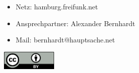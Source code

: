 \documentclass[c]{beamer}
\begin{document}
\begin{frame}{}
	\begin{columns}
		\begin{column}{1\textwidth}
			\begin{itemize}
				\item Netz: hamburg.freifunk.net
				\item Ansprechpartner: Alexander Bernhardt 
				\item Mail: bernhardt@hauptsache.net
		\end{itemize}
			\begin{center}
				\includegraphics[width=0.2\textwidth]{Bilder/cc-by}
			\end{center}
		\end{column}
	\end{columns}
\end{frame}
\end{document}
